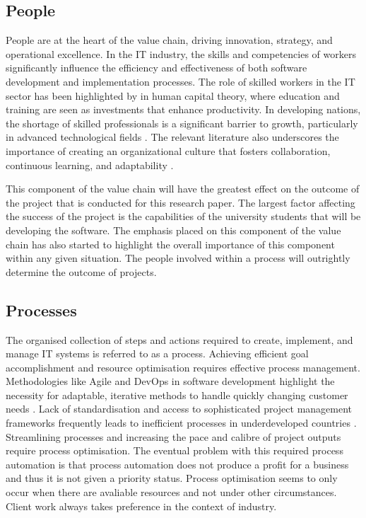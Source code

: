 \subsection{People}
\par{People are at the heart of the value chain, driving innovation, strategy, and operational excellence. In the IT industry, the skills and competencies of workers significantly influence the efficiency and effectiveness of both software development and implementation processes. The role of skilled workers in the IT sector has been highlighted by \cite{becker2009human} in human capital theory, where education and training are seen as investments that enhance productivity. In developing nations, the shortage of skilled professionals is a significant barrier to growth, particularly in advanced technological fields \citep{heeks2017information}. The relevant literature also underscores the importance of creating an organizational culture that fosters collaboration, continuous learning, and adaptability \citep{schein2010organizational}.

This component of the value chain will have the greatest effect on the outcome of the project that is conducted for this research paper. The largest factor affecting the success of the project is the capabilities of the university students that will be developing the software. The emphasis placed on this component of the value chain has also started to highlight the overall importance of this component within any given situation. The people involved within a process will outrightly determine the outcome of projects.}
\subsection{Processes}
\par{The organised collection of steps and actions required to create, implement, and manage IT systems is referred to as a process. Achieving efficient goal accomplishment and resource optimisation requires effective process management. Methodologies like Agile and DevOps in software development highlight the necessity for adaptable, iterative methods to handle quickly changing customer needs \citep{fowler2001agile}. Lack of standardisation and access to sophisticated project management frameworks frequently leads to inefficient processes in underdeveloped countries \citep{boehm1988spiral}. Streamlining processes and increasing the pace and calibre of project outputs require process optimisation. The eventual problem with this required process automation is that process automation does not produce a profit for a business and thus it is not given a priority status. Process optimisation seems to only occur when there are avaliable resources and not under other circumstances. Client work always takes preference in the context of industry.}
